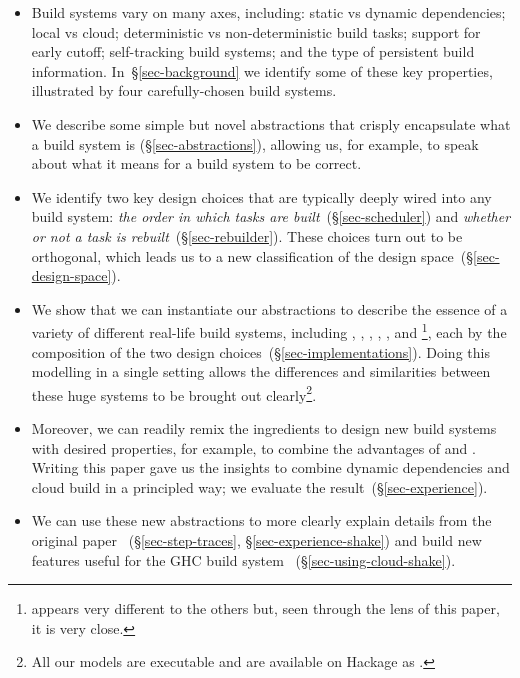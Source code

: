 \begin{itemize}
\item Build systems vary on many axes, including: static vs dynamic
  dependencies; local vs cloud; deterministic vs non-deterministic build tasks;
  support for early cutoff; self-tracking build systems; and the type of
  persistent build information. In~\S\ref{sec-background} we identify some of these key
  properties, illustrated by four carefully-chosen build systems.

\item We describe some simple but novel abstractions that
  crisply encapsulate what a build system is (\S\ref{sec-abstractions}),
  allowing us, for example, to speak about what it means for a build system to be correct.

\item We identify two key design choices that are typically deeply wired into
  any build system: \emph{the order in which tasks are
  built}~(\S\ref{sec-scheduler}) and \emph{whether or not a
  task is rebuilt}~(\S\ref{sec-rebuilder}). These choices turn out to
  be orthogonal, which leads us to a new classification of the design
  space~(\S\ref{sec-design-space}).

\item We show that we can instantiate our abstractions to describe the essence
of a variety of different real-life build systems, including \Make, \Shake,
\Bazel, \Buck, \Nix, and \Excel\footnote{\Excel appears very different to the
others but, seen through the lens of this paper, it is very close.}, each by the
composition of the two design choices~(\S\ref{sec-implementations}). Doing this
modelling in a single setting allows the differences and similarities between
these huge systems to be brought out clearly\footnote{All our models are
executable and are available on Hackage as .}.

\item Moreover, we can readily remix the ingredients to design new build systems
with desired properties, for example, to combine the advantages of \Shake and
\Bazel. Writing this paper gave us the insights to combine dynamic dependencies and
cloud build in a principled way; we evaluate the result~(\S\ref{sec-experience}).

\item We can use these new
abstractions to more clearly explain details from the original \Shake
paper~\cite{mitchell2012shake} (\S\ref{sec-step-traces}, \S\ref{sec-experience-shake})
and build new features useful for the GHC build system~\cite{hadrian} (\S\ref{sec-using-cloud-shake}).

\end{itemize}

